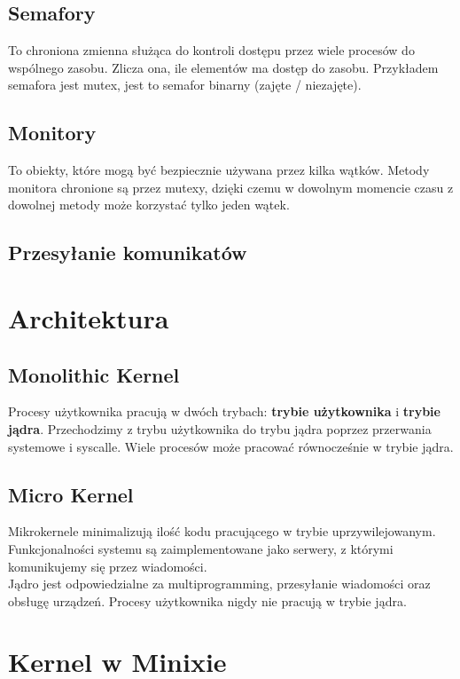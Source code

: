 \documentclass[12pt, a4paper, polish, openany]{book}
\begin{document}
\subsection{Semafory}
To chroniona zmienna służąca do kontroli dostępu przez wiele procesów do wspólnego zasobu. Zlicza ona, ile elementów ma dostęp do zasobu. Przykładem semafora jest mutex, jest to semafor binarny (zajęte / niezajęte).
\subsection{Monitory}
To obiekty, które mogą być bezpiecznie używana przez kilka wątków. Metody monitora chronione są przez mutexy, dzięki czemu w dowolnym momencie czasu z dowolnej metody może korzystać tylko jeden wątek.
\subsection{Przesyłanie komunikatów}
\section{Architektura}
\subsection{Monolithic Kernel}
Procesy użytkownika pracują w dwóch trybach: \textbf{trybie użytkownika} i \textbf{trybie jądra}. Przechodzimy z trybu użytkownika do trybu jądra poprzez przerwania systemowe i syscalle. Wiele procesów może pracować równocześnie w trybie jądra.
\subsection{Micro Kernel}
Mikrokernele minimalizują ilość kodu pracującego w trybie uprzywilejowanym. Funkcjonalności systemu są zaimplementowane jako serwery, z którymi komunikujemy się przez wiadomości.\\
Jądro jest odpowiedzialne za multiprogramming, przesyłanie wiadomości oraz obsługę urządzeń. Procesy użytkownika nigdy nie pracują w trybie jądra.
\section{Kernel w Minixie}
\end{document}

